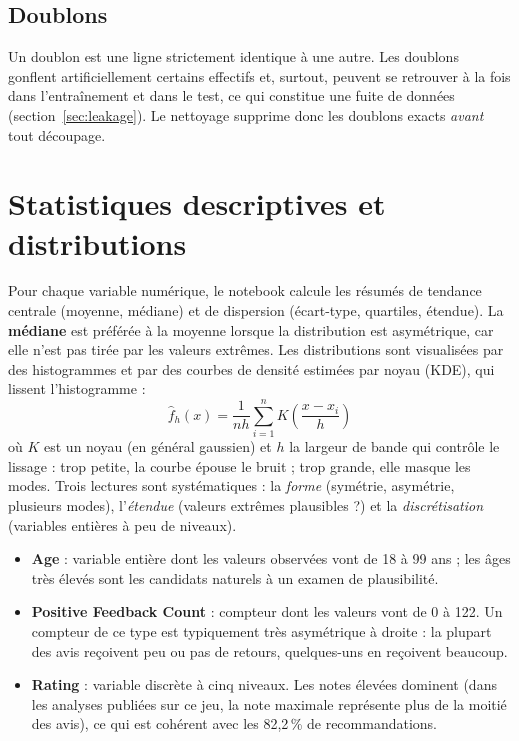 \documentclass[11pt,a4paper]{report}
\numberwithin{equation}{chapter}
\begin{document}
\subsection{Doublons}
Un doublon est une ligne strictement identique à une autre. Les doublons gonflent artificiellement certains effectifs et, surtout, peuvent se retrouver à la fois dans l'entraînement et dans le test, ce qui constitue une fuite de données (section~\ref{sec:leakage}). Le nettoyage supprime donc les doublons exacts \textit{avant} tout découpage.

\section{Statistiques descriptives et distributions}
Pour chaque variable numérique, le notebook calcule les résumés de tendance centrale (moyenne, médiane) et de dispersion (écart-type, quartiles, étendue). La \textbf{médiane} est préférée à la moyenne lorsque la distribution est asymétrique, car elle n'est pas tirée par les valeurs extrêmes. Les distributions sont visualisées par des histogrammes et par des courbes de densité estimées par noyau (KDE), qui lissent l'histogramme :
\begin{equation}\label{eq:kde}
\hat{f}_h(x) = \frac{1}{n h}\sum_{i=1}^{n} K\!\left(\frac{x - x_i}{h}\right)
\end{equation}
où $K$ est un noyau (en général gaussien) et $h$ la largeur de bande qui contrôle le lissage : trop petite, la courbe épouse le bruit ; trop grande, elle masque les modes. Trois lectures sont systématiques : la \textit{forme} (symétrie, asymétrie, plusieurs modes), l'\textit{étendue} (valeurs extrêmes plausibles ?) et la \textit{discrétisation} (variables entières à peu de niveaux).
\begin{itemize}
\item \textbf{Age} : variable entière dont les valeurs observées vont de 18 à 99 ans ; les âges très élevés sont les candidats naturels à un examen de plausibilité.
\item \textbf{Positive Feedback Count} : compteur dont les valeurs vont de 0 à 122. Un compteur de ce type est typiquement très asymétrique à droite : la plupart des avis reçoivent peu ou pas de retours, quelques-uns en reçoivent beaucoup.
\item \textbf{Rating} : variable discrète à cinq niveaux. Les notes élevées dominent (dans les analyses publiées sur ce jeu, la note maximale représente plus de la moitié des avis), ce qui est cohérent avec les 82,2\,\% de recommandations.
\end{itemize}
\end{document}
